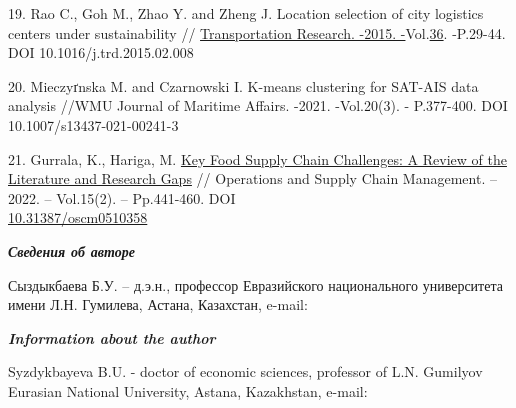 \begin{references}
19. Rao C., Goh M., Zhao Y. and Zheng J. Location selection of city
logistics centers under sustainability //
\href{https://www.sciencedirect.com/journal/transportation-research-part-d-transport-and-environment}{Transportation
Research. -2015.
-}Vol.\href{file:///C:/Users/admin/Desktop/загрузки/36}{36}. -P.29-44.
DOI 10.1016/j.trd.2015.02.008

20. Mieczyґnska M. and Czarnowski I. K-means clustering for SAT-AIS data
analysis //WMU Journal of Maritime Affairs. -2021. -Vol.20(3). -
P.377-400. DOI 10.1007/s13437-021-00241-3

21. Gurrala, K., Hariga, M.
\href{https://journal.oscm-forum.org/publication/article/key-food-supply-chain-challenges-a-review-of-the-literature-and-research-gaps}{Key
Food Supply Chain Challenges: A Review of the Literature and Research
Gaps} // Operations and Supply Chain Management. -- 2022. -- Vol.15(2).
-- Pp.441-460. DOI\\
\href{http://doi.org/10.31387/oscm0510358}{10.31387/oscm0510358}
\end{references}

\begin{authorinfo}
\emph{{\bfseries Сведения об авторе}}

Сыздыкбаева Б.У. -- д.э.н., профессор Евразийского национального
университета имени Л.Н. Гумилева, Астана, Казахстан, e-mail:
\href{mailto:bakyt_syzdykbaeva@mail.ru}{}

\emph{{\bfseries Information about the author}}

Syzdykbayeva B.U. - doctor of economic sciences, professor of
L.N. Gumilyov Eurasian National University, Astana, Kazakhstan, e-mail:
\href{mailto:bakyt_syzdykbaeva@mail.ru}{}
\end{authorinfo}
